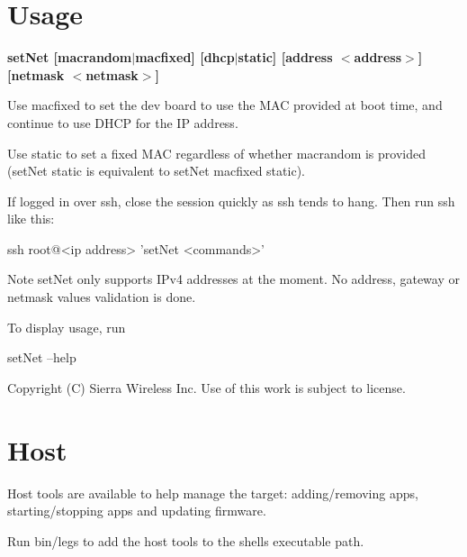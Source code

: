 \section*{Usage}

{\bfseries {\ttfamily  set\+Net \mbox{[}macrandom$\vert$macfixed\mbox{]} \mbox{[}dhcp$\vert$static\mbox{]} \mbox{[}address $<$address$>$\mbox{]} \mbox{[}netmask $<$netmask$>$\mbox{]} }}

Use {\ttfamily macfixed} to set the dev board to use the M\+A\+C provided at boot time, and continue to use D\+H\+C\+P for the I\+P address.

Use {\ttfamily static} to set a fixed M\+A\+C regardless of whether {\ttfamily macrandom} is provided ({\ttfamily set\+Net} {\ttfamily static} is equivalent to {\ttfamily set\+Net} {\ttfamily macfixed} {\ttfamily static}).

If logged in over {\ttfamily ssh}, close the session quickly as ssh tends to hang. Then run ssh like this\+: \begin{DoxyVerb}ssh root@<ip address> 'setNet <commands>'
\end{DoxyVerb}


\begin{DoxyNote}{Note}
{\ttfamily set\+Net} only supports I\+Pv4 addresses at the moment. No address, gateway or netmask values validation is done.
\end{DoxyNote}
To display usage, run \begin{DoxyVerb}setNet --help \end{DoxyVerb}






Copyright (C) Sierra Wireless Inc. Use of this work is subject to license. \hypertarget{toolsHost}{}\section{Host}\label{toolsHost}
Host tools are available to help manage the target\+: adding/removing apps, starting/stopping apps and updating firmware.

Run {\ttfamily bin/legs} to add the host tools to the shell\textquotesingle{}s executable path.

